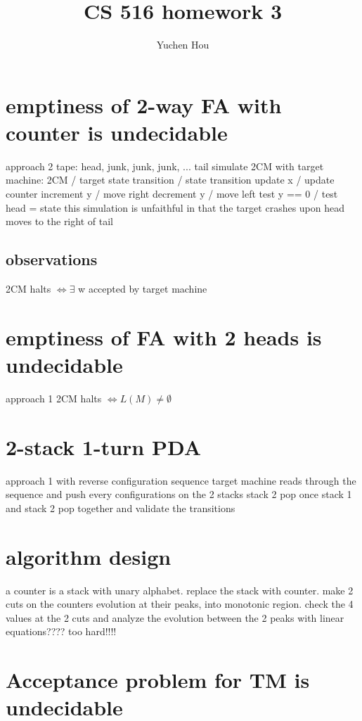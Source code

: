 \documentclass{article}
\begin{document}
\lstset{language=python, tabsize=4}
\title{CS 516 homework 3}
\author{Yuchen Hou}
\maketitle

\section{emptiness of 2-way FA with counter is undecidable}
approach 2
tape: head, junk, junk, junk, ... tail
simulate 2CM with target machine:
2CM / target
state transition / state transition
update x / update counter
increment y / move right
decrement y / move left
test y == 0 / test head = state
this simulation is unfaithful in that the target crashes upon head moves to the right of tail
\subsection{observations}
2CM halts $ \iff \exists $ w accepted by target machine 

\section{emptiness of FA with 2 heads is undecidable}
approach 1
2CM halts $ \iff L(M) \neq \emptyset$

\section{2-stack 1-turn PDA}
approach 1 with reverse configuration sequence
target machine reads through the sequence and push every configurations on the 2 stacks
stack 2 pop once
stack 1 and stack 2 pop together and validate the transitions

\section{algorithm design}
a counter is a stack with unary alphabet. replace the stack with counter. make 2 cuts on the counters evolution at their peaks, into monotonic region. check the 4 values at the 2 cuts and analyze the evolution between the 2 peaks with linear equations???? too hard!!!!

\section{Acceptance problem for TM is undecidable}
\end{document}
